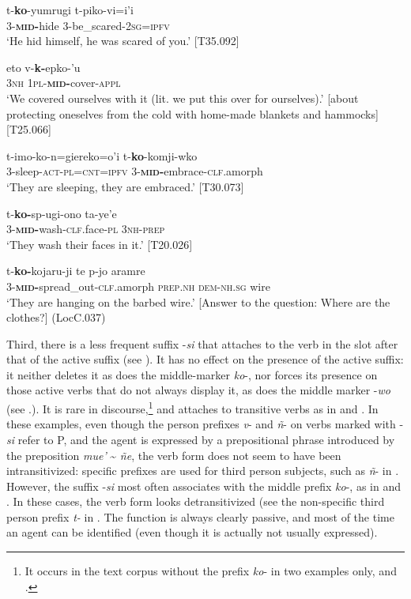 \documentclass[output=paper]{langscibook}
\begin{document}
\ea
\label{ex:Rose:54}
\gll t-\textbf{ko}-yumrugi t-piko-vi=i'i\\
3-\textsc{\textbf{mid}}\textbf{-}hide 3-be\_scared-\textsc{2sg=ipfv}\\
\glt ‘He hid himself, he was scared of you.’ [T35.092]
\z

\ea
\label{ex:Rose:55}
\gll eto v-\textbf{k-}epko-'u \\
\textsc{3nh} \textsc{1pl-\textbf{mid}}\textbf{-}cover-\textsc{appl}\\
\glt ‘We covered ourselves with it (lit. we put this over for ourselves).’ [about protecting oneselves from the cold with home-made blankets and hammocks] [T25.066]
\z

\ea
\label{ex:Rose:56}
\gll t-imo-ko-n=giereko=o'i t-\textbf{ko}-komji-wko \\
3-sleep-\textsc{act-pl=cnt=ipfv} 3-\textsc{\textbf{mid}}\textbf{-}embrace-\textsc{clf}.amorph\\
\glt ‘They are sleeping, they are embraced.’ [T30.073]
\z

\ea
\label{ex:Rose:57}
\gll t-\textbf{ko-}sp-ugi-ono ta-ye'e \\
3\textsc{-}\textbf{\textsc{mid-}}wash\textsc{-clf}.face\textsc{-pl} 3\textsc{nh-prep}\\
\glt ‘‎They wash their faces in it.' [T20.026]
\z

\ea
\label{ex:Rose:58}
\gll t-\textbf{ko-}kojaru-ji te p-jo aramre\\
3-\textsc{\textbf{mid}}\textbf{-}spread\_out-\textsc{clf}.amorph \textsc{prep.nh} \textsc{dem-nh.sg} wire\\
\glt ‘They are hanging on the barbed wire.’ [Answer to the question: Where are the clothes?] (LocC.037)
\z


Third, there is a less frequent suffix -\textit{si} that attaches to the verb in the slot after that of the active suffix (see ). It has no effect on the presence of the active suffix: it neither deletes it as does the middle-marker \textit{ko}-, nor forces its presence on those active verbs that do not always display it, as does the middle marker -\textit{wo} (see .). It is rare in discourse,\footnote{It occurs in the text corpus without the prefix \textit{ko}- in two examples only,  and .} and attaches to transitive verbs as in  and . In these examples, even though the person prefixes \textit{v}- and \textit{ñ}- on verbs marked with -\textit{si} refer to P, and the agent is expressed by a prepositional phrase introduced by the preposition \textit{mue'} {\textasciitilde} \textit{ñe}, the verb form does not seem to have been intransitivized: specific prefixes are used for third person subjects, such as \textit{ñ}- in . However, the suffix -\textit{si} most often associates with the middle prefix \textit{ko}-, as in  and . In these cases, the verb form looks detransitivized (see the non-specific third person prefix \textit{t-} in . The function is always clearly passive, and most of the time an agent can be identified (even though it is actually not usually expressed).
\end{document}
